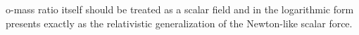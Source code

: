 o-mass ratio itself should be treated as a scalar field and in the logarithmic form presents exactly as the relativistic generalization of the Newton-like scalar force.
